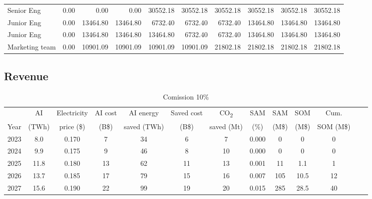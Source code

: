 \begin{table}[h]
\begin{tabular}{lrrrrrrrrr}
Senior Eng                       & 0.00     & 0.00     & 0.00     & 30552.18 & 30552.18 & 30552.18 & 30552.18 & 30552.18 & 30552.18\\
Junior Eng                       & 0.00     & 13464.80 & 13464.80 & 6732.40  & 6732.40  & 6732.40  & 13464.80 & 13464.80 & 13464.80\\
Junior Eng                       & 0.00     & 13464.80 & 13464.80 & 13464.80 & 6732.40  & 6732.40  & 13464.80 & 13464.80 & 13464.80\\
Marketing team             & 0.00     & 10901.09 & 10901.09 & 10901.09 & 10901.09 & 21802.18 & 21802.18 & 21802.18 & 21802.18\\
\bottomrule
\end{tabular}
\end{table}

\subsection{Revenue}

\begin{table}[h]
\footnotesize
\begin{tabular}{ccccccccccccc}
\toprule
 & AI & Electricity & AI cost & AI energy  & Saved cost & CO\textsubscript{2}  & SAM & SAM  & SOM  & Cum. \\
Year & (TWh) & price (\$) & (B\$) & saved (TWh) &  (B\$) & saved (Mt) & (\%) &   (M\$) & (M\$) & SOM (M\$) \\
\midrule
2023 & 8.0    & 0.170   & 7   & 34  & 6   & 7   & 0.000     & 0     & 0    & 0 \\
2024 & 9.9  & 0.175  & 9   & 46  & 8   & 10  & 0.000     & 0      & 0    & 0 \\
2025 & 11.8 & 0.180   & 13  & 62  & 11  & 13  & 0.001 & 11     & 1.1  & 1 \\
2026 & 13.7 & 0.185  & 17  & 79  & 15  & 16  & 0.007 & 105   & 10.5 & 12 \\
2027 & 15.6 & 0.190  & 22  & 99  & 19  & 20  & 0.015 & 285   & 28.5 & 40 \\
\bottomrule
\end{tabular}
\caption{Comission 10\%}
\end{table}
